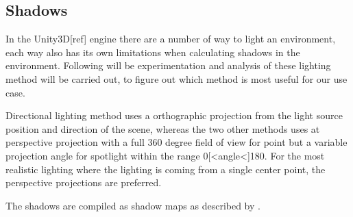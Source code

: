 \subsection{Shadows}\label{sec:shadowsexperiment}

In the Unity3D[ref] engine there are a number of way to light an environment, each way also has its own limitations when calculating shadows in the environment. Following will be experimentation and analysis of these lighting method will be carried out, to figure out which method is most useful for our use case. 


Directional lighting method uses a orthographic projection from the light source position and direction of the scene, whereas the two other methods uses at perspective projection with a full 360 degree field of view for point but a variable projection angle for spotlight within the range 0[<angle<]180. For the most realistic lighting where the lighting is coming from a single center point, the perspective projections are preferred\cite{unitylighttypes}.

The shadows are compiled as shadow maps as described by \cite{Wimmer2004}.

